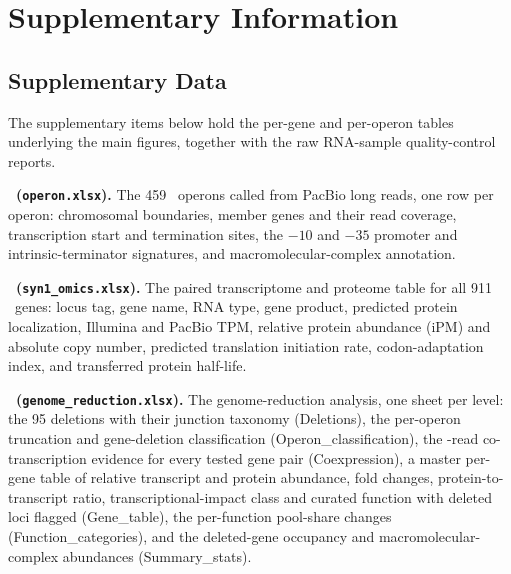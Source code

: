 \newpage

\section{Supplementary Information}
\label{SI}

\subsection*{Supplementary Data}

The supplementary items below hold the per-gene and per-operon tables underlying the main figures, together with the raw RNA-sample quality-control reports.

\noindent\textbf{\sdoperon~(\texttt{operon.xlsx}).}
The 459 \syn~operons called from PacBio long reads, one row per operon: chromosomal boundaries, member genes and their read coverage, transcription start and termination sites, the $-10$ and $-35$ promoter and intrinsic-terminator signatures, and macromolecular-complex annotation.

\noindent\textbf{\sdomics~(\texttt{syn1\_omics.xlsx}).}
The paired transcriptome and proteome table for all 911 \syn~genes: locus tag, gene name, RNA type, gene product, predicted protein localization, Illumina and PacBio TPM, relative protein abundance (iPM) and absolute copy number, predicted translation initiation rate, codon-adaptation index, and transferred protein half-life.

\noindent\textbf{\sdreduction~(\texttt{genome\_reduction.xlsx}).}
The genome-reduction analysis, one sheet per level: the 95 deletions with their junction taxonomy (Deletions), the per-operon truncation and gene-deletion classification (Operon\_classification), the \syna-read co-transcription evidence for every tested gene pair (Coexpression), a master per-gene table of relative transcript and protein abundance, fold changes, protein-to-transcript ratio, transcriptional-impact class and curated function with deleted loci flagged (Gene\_table), the per-function pool-share changes (Function\_categories), and the deleted-gene occupancy and macromolecular-complex abundances (Summary\_stats).

